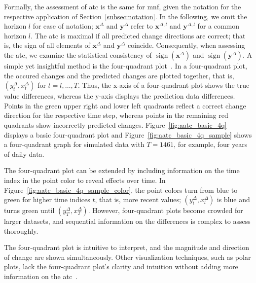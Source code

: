 \documentclass[pdflatex]{sn-jnl}
\theoremstyle{plain}%
\theoremstyle{definition}
\DeclareMathOperator{\sign}{sign}
\newcommand{\diffxl}{\mathbf{x}^{\Delta,l}}
\newcommand{\diffyl}{\mathbf{y}^{\Delta,l}}
\newcommand{\diffx}{\mathbf{x}^{\Delta}}
\newcommand{\diffy}{\mathbf{y}^{\Delta}}
\newcommand{\diffxt}[1][t]{x^{\Delta}_{#1}}
\newcommand{\diffyt}[1][t]{y^{\Delta}_{#1}}
\begin{document}
Formally, the assessment of \ac{atc} is the same for \ac{mnf}, given the notation for the respective application of Section~\ref{subsec:notation}.
In the following, we omit the horizon $l$ for ease of notation; $\diffx$ and $\diffy$ refer to $\diffxl$ and $\diffyl$ for a common horizon $l$.
The \ac{atc} is maximal if all predicted change directions are correct; that is, the sign of all elements of $\diffx$ and $\diffy$ coincide.
Consequently, when assessing the \ac{atc}, we examine the statistical consistency of $\sign(\diffx)$ and $\sign(\diffy)$.
A simple yet insightful method is the four-quadrant plot~\citep[see, e.g., ][]{Perrino1998, Saugel2015}.
In a four-quadrant plot, the occured changes and the predicted changes are plotted together, that is, $(\diffyt, \diffxt)$ for $t = l, \dots, T$.
Thus, the x-axis of a four-quadrant plot shows the true value differences, whereas the y-axis displays the prediction data differences.
Points in the green upper right and lower left quadrants reflect a correct change direction for the respective time step, whereas points in the remaining red quadrants show incorrectly predicted changes.
Figure~\ref{fig:aatc_basic_4q} displays a basic four-quadrant plot and Figure~\ref{fig:aatc_basic_4q_sample} shows a four-quadrant graph for simulated data with $T=1461$, for example, four years of daily data.

The four-quadrant plot can be extended by including information on the time index in the point color to reveal effects over time.
In Figure~\ref{fig:aatc_basic_4q_sample_color}, the point colors turn from blue to green for higher time indices $t$, that is, more recent values; $(\diffyt[l], \diffxt[l])$ is blue and turns green until $(\diffyt[T], \diffxt[T])$.
However, four-quadrant plots become crowded for larger datasets, and sequential information on the differences is complex to assess thoroughly.

The four-quadrant plot is intuitive to interpret, and the magnitude and direction of change are shown simultaneously.
Other visualization techniques, such as polar plots, lack the four-quadrant plot's clarity and intuition without adding more information on the \ac{atc}~\citep{Saugel2015}.
\end{document}
